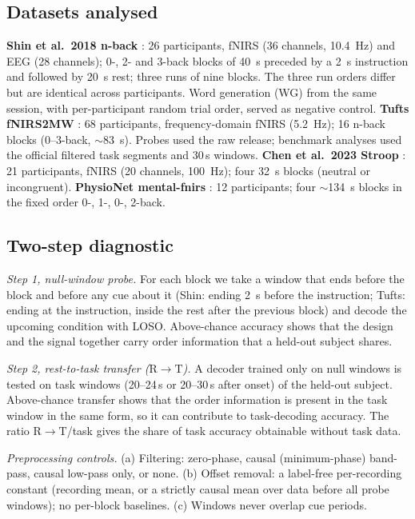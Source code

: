\documentclass[preprint,11pt]{elsarticle}
\newcommand{\Rr}{\ensuremath{\mathrm{R}\!\to\!\mathrm{T}}}
\begin{document}
\subsection{Datasets analysed}
\textbf{Shin et al.\ 2018 n-back} \citep{shin2018}: 26 participants, fNIRS (36 channels, \SI{10.4}{Hz}) and EEG (28 channels); 0-, 2- and 3-back blocks of \SI{40}{s} preceded by a \SI{2}{s} instruction and followed by \SI{20}{s} rest; three runs of nine blocks. The three run orders differ but are identical across participants. Word generation (WG) from the same session, with per-participant random trial order, served as negative control.
\textbf{Tufts fNIRS2MW} \citep{huang2021}: 68 participants, frequency-domain fNIRS (\SI{5.2}{Hz}); 16 n-back blocks (0--3-back, $\sim$\SI{83}{s}). Probes used the raw release; benchmark analyses used the official filtered task segments and 30\,s windows.
\textbf{Chen et al.\ 2023 Stroop} \citep{chen2023}: 21 participants, fNIRS (20 channels, \SI{100}{Hz}); four \SI{32}{s} blocks (neutral or incongruent).
\textbf{PhysioNet mental-fnirs} \citep{mukli2021}: 12 participants; four $\sim$\SI{134}{s} blocks in the fixed order 0-, 1-, 0-, 2-back.

\subsection{Two-step diagnostic}
\label{sec:diagnostic}
\emph{Step 1, null-window probe.} For each block we take a window that ends before the block and before any cue about it (Shin: ending \SI{2}{s} before the instruction; Tufts: ending at the instruction, inside the rest after the previous block) and decode the upcoming condition with LOSO. Above-chance accuracy shows that the design and the signal together carry order information that a held-out subject shares.

\emph{Step 2, rest-to-task transfer (\Rr).} A decoder trained only on null windows is tested on task windows (20--24\,s or 20--30\,s after onset) of the held-out subject. Above-chance transfer shows that the order information is present in the task window in the same form, so it can contribute to task-decoding accuracy. The ratio \Rr/task gives the share of task accuracy obtainable without task data.

\emph{Preprocessing controls.} (a) Filtering: zero-phase, causal (minimum-phase) band-pass, causal low-pass only, or none. (b) Offset removal: a label-free per-recording constant (recording mean, or a strictly causal mean over data before all probe windows); no per-block baselines. (c) Windows never overlap cue periods.
\end{document}
